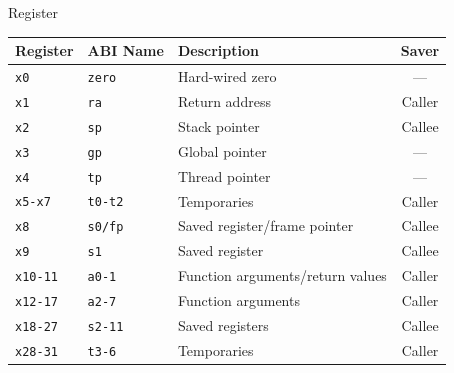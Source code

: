 \begin{frame}[c]{Register}{}
	\begin{center}
		{\rmfamily
			\begin{tabular}{|l|l|l|c|}
				\hline
				Register        & ABI Name       & Description                      & Saver  \\ \hline
				\texttt{x0}     & \texttt{zero}  & Hard-wired zero                  & ---    \\
				\texttt{x1}     & \texttt{ra}    & Return address                   & Caller \\
				\texttt{x2}     & \texttt{sp}    & Stack pointer                    & Callee \\
				\texttt{x3}     & \texttt{gp}    & Global pointer                   & ---    \\
				\texttt{x4}     & \texttt{tp}    & Thread pointer                   & ---    \\
				\texttt{x5-x7}  & \texttt{t0-t2} & Temporaries                      & Caller \\
				\texttt{x8}     & \texttt{s0/fp} & Saved register/frame pointer     & Callee \\
				\texttt{x9}     & \texttt{s1}    & Saved register                   & Callee \\
				\texttt{x10-11} & \texttt{a0-1}  & Function arguments/return values & Caller \\
				\texttt{x12-17} & \texttt{a2-7}  & Function arguments               & Caller \\
				\texttt{x18-27} & \texttt{s2-11} & Saved registers                  & Callee \\
				\texttt{x28-31} & \texttt{t3-6}  & Temporaries                      & Caller \\ \hline
			\end{tabular}
		}
	\end{center}
\end{frame}

